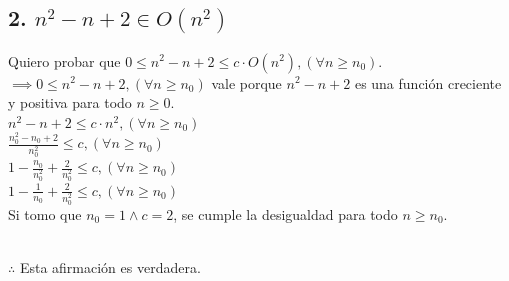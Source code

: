 \documentclass[12 pt]{article}
\begin{document}
    \subsection*{2. \(n^{2}-n+2 \in O(n^{2})\)}
        Quiero probar que \(0 \leq n^{2}-n+2 \leq c \cdot O(n^{2}), (\forall n \geq n_{0})\). \\
        \(\implies 0 \leq n^{2}-n+2, (\forall n \geq n_{0})\) vale porque $n^{2}-n+2$ es una función creciente y positiva para todo $n \geq 0$. \\
        \(n^{2}-n+2 \leq c \cdot n^{2}, (\forall n \geq n_{0})\) \\
        \(\frac{n_{0}^{2}-n_{0}+2}{n_{0}^{2}} \leq c, (\forall n \geq n_{0})\) \\
        \(1-\frac{n_{0}}{n_{0}^{2}} + \frac{2}{n_{0}^{2}} \leq c, (\forall n \geq n_{0})\) \\
        \(1-\frac{1}{n_{0}} + \frac{2}{n_{0}^{2}} \leq c, (\forall n \geq n_{0})\) \\
        Si tomo que \(n_{0} = 1 \wedge c = 2\), se cumple la desigualdad para todo $n \geq n_{0}$. \\
        \begin{center}
             \\           
            \(\therefore\) Esta afirmación es verdadera.
        \end{center}
        
\end{document}
